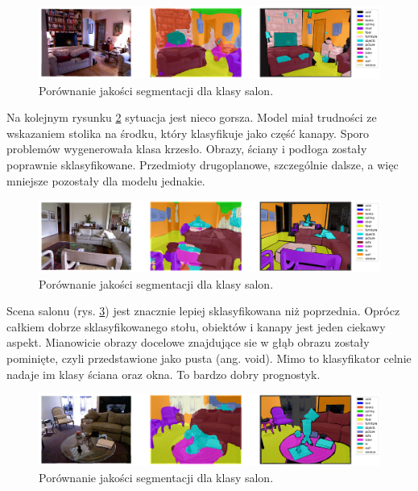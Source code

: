 \begin{figure}[ht!]
    \centering
    \includegraphics[width=\textwidth]{img/preds_analysis/gt_vs_pred/living_room-1.png}
    \caption{Porównanie jakości segmentacji dla klasy salon.}
    \label{fig:living_room-pred-1}
\end{figure}

Na kolejnym rysunku \ref{fig:living_room-pred-2} sytuacja jest nieco gorsza. Model miał trudności ze wskazaniem stolika na środku, który klasyfikuje jako część kanapy. Sporo problemów wygenerowała klasa krzesło. Obrazy, ściany i podłoga zostały poprawnie sklasyfikowane. Przedmioty drugoplanowe, szczególnie dalsze, a więc mniejsze pozostały dla modelu jednakie.
\begin{figure}[ht!]
    \centering
    \includegraphics[width=\textwidth]{img/preds_analysis/gt_vs_pred/living_room-2.png}
    \caption{Porównanie jakości segmentacji dla klasy salon.}
    \label{fig:living_room-pred-2}
\end{figure}

Scena salonu (rys. \ref{fig:living_room-pred-3}) jest znacznie lepiej sklasyfikowana niż poprzednia. Oprócz całkiem dobrze sklasyfikowanego stołu, obiektów i kanapy jest jeden ciekawy aspekt. Mianowicie obrazy docelowe znajdujące sie w głąb obrazu zostały pominięte, czyli przedstawione jako pusta (ang. void). Mimo to klasyfikator celnie nadaje im klasy ściana oraz okna. To bardzo dobry prognostyk.

\begin{figure}[ht!]
    \centering
    \includegraphics[width=\textwidth]{img/preds_analysis/gt_vs_pred/living_room-3.png}
    \caption{Porównanie jakości segmentacji dla klasy salon.}
    \label{fig:living_room-pred-3}
\end{figure}

